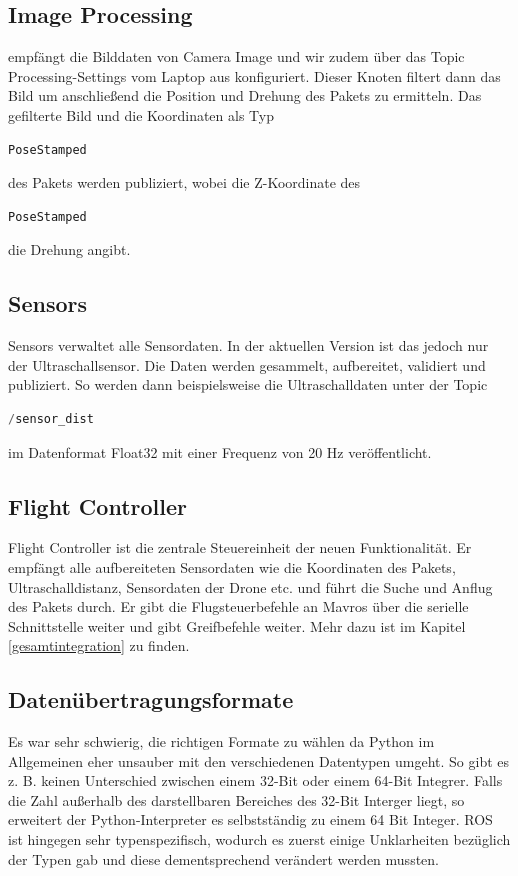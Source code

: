 \subsection{Image Processing} empfängt die Bilddaten von Camera Image und wir zudem über das Topic Processing-Settings vom Laptop aus konfiguriert. Dieser Knoten filtert dann das Bild um anschließend die Position und Drehung des Pakets zu ermitteln. Das gefilterte Bild und die Koordinaten als Typ
\begin{lstlisting}[language=Python]
PoseStamped
\end{lstlisting}
des Pakets werden publiziert, wobei die Z-Koordinate des 
\begin{lstlisting}[language=Python]
PoseStamped
\end{lstlisting}
die Drehung angibt.

\subsection{Sensors} Sensors verwaltet alle Sensordaten. In der aktuellen Version ist das jedoch nur der Ultraschallsensor. Die Daten werden gesammelt, aufbereitet, validiert und publiziert. So werden dann beispielsweise die Ultraschalldaten unter der Topic 
\begin{lstlisting}[language=Python]
/sensor_dist
\end{lstlisting}
im Datenformat Float32 mit einer Frequenz von 20 Hz veröffentlicht.

\subsection{Flight Controller} Flight Controller ist die zentrale Steuereinheit der neuen Funktionalität. Er empfängt alle aufbereiteten Sensordaten wie die Koordinaten des Pakets, Ultraschalldistanz, Sensordaten der Drone etc. und führt die Suche und Anflug des Pakets durch. Er gibt die Flugsteuerbefehle an Mavros über die serielle Schnittstelle weiter und gibt Greifbefehle weiter. Mehr dazu ist im Kapitel \ref{gesamtintegration} zu finden. 

\subsection{Datenübertragungsformate}
Es war sehr schwierig, die richtigen Formate zu wählen da Python im Allgemeinen eher unsauber mit den verschiedenen Datentypen umgeht. So gibt es z. B. keinen Unterschied zwischen einem 32-Bit oder einem 64-Bit Integrer. Falls die Zahl außerhalb des darstellbaren Bereiches des 32-Bit Interger liegt, so erweitert der Python-Interpreter es selbstständig zu einem 64 Bit Integer. ROS ist hingegen sehr typenspezifisch, wodurch es zuerst einige Unklarheiten bezüglich der Typen gab und diese dementsprechend verändert werden mussten.\\



